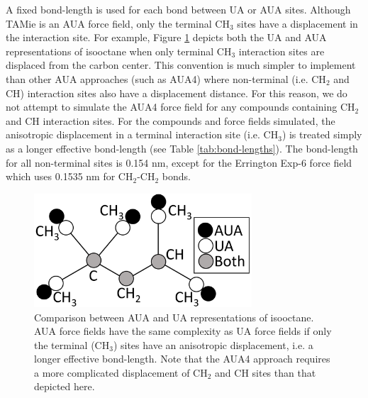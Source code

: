 \documentclass[preprint,letterpaper,floatfix,citeautoscript,aip,jcp]{revtex4-1}
\begin{document}
A fixed bond-length is used for each bond between UA or AUA sites. Although TAMie is an AUA force field, only the terminal CH$_3$ sites have a displacement in the interaction site. For example, Figure \ref{fig:AUA_isooctane} depicts both the UA and AUA representations of isooctane when only terminal CH$_3$ interaction sites are displaced from the carbon center. This convention is much simpler to implement than other AUA approaches (such as AUA4) where non-terminal (i.e. CH$_2$ and CH) interaction sites also have a displacement distance. For this reason, 
we do not attempt to simulate the AUA4 force field for any compounds containing CH$_2$ and CH interaction sites. For the compounds and force fields simulated, the anisotropic displacement in a terminal interaction site (i.e. CH$_3$) is treated simply as a longer effective bond-length (see Table \ref{tab:bond-lengths}). The bond-length for all non-terminal sites is 0.154 nm, except for the Errington Exp-6 force field which uses 0.1535 nm for CH$_2$-CH$_2$ bonds.

\begin{figure}[htb!]
	\centering
	\includegraphics[width=3.2in]{AUA_isooctane}
	\caption{Comparison between AUA and UA representations of isooctane. AUA force fields have the same complexity as UA force fields if only the terminal (CH$_3$) sites have an anisotropic displacement, i.e. a longer effective bond-length. Note that the AUA4 approach requires a more complicated displacement of CH$_2$ and CH sites than that depicted here. \cite{AUA4} } 
	\label{fig:AUA_isooctane}
\end{figure}
\end{document}
